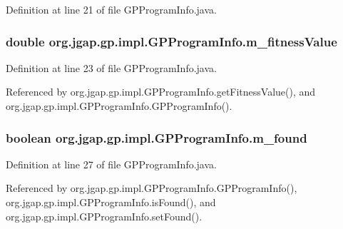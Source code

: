 Definition at line 21 of file G\-P\-Program\-Info.\-java.

\hypertarget{classorg_1_1jgap_1_1gp_1_1impl_1_1_g_p_program_info_aae643f2a3dc53c6264935548d4d93e41}{
\subsubsection[{m\-\_\-fitness\-Value}]{\setlength{\rightskip}{0pt plus 5cm}double org.\-jgap.\-gp.\-impl.\-G\-P\-Program\-Info.\-m\-\_\-fitness\-Value\hspace{0.3cm}{\ttfamily [private]}}}\label{classorg_1_1jgap_1_1gp_1_1impl_1_1_g_p_program_info_aae643f2a3dc53c6264935548d4d93e41}


Definition at line 23 of file G\-P\-Program\-Info.\-java.



Referenced by org.\-jgap.\-gp.\-impl.\-G\-P\-Program\-Info.\-get\-Fitness\-Value(), and org.\-jgap.\-gp.\-impl.\-G\-P\-Program\-Info.\-G\-P\-Program\-Info().

\hypertarget{classorg_1_1jgap_1_1gp_1_1impl_1_1_g_p_program_info_ae280cb35b66e8c6cbff5c7440a51afc5}{
\subsubsection[{m\-\_\-found}]{\setlength{\rightskip}{0pt plus 5cm}boolean org.\-jgap.\-gp.\-impl.\-G\-P\-Program\-Info.\-m\-\_\-found\hspace{0.3cm}{\ttfamily [private]}}}\label{classorg_1_1jgap_1_1gp_1_1impl_1_1_g_p_program_info_ae280cb35b66e8c6cbff5c7440a51afc5}


Definition at line 27 of file G\-P\-Program\-Info.\-java.



Referenced by org.\-jgap.\-gp.\-impl.\-G\-P\-Program\-Info.\-G\-P\-Program\-Info(), org.\-jgap.\-gp.\-impl.\-G\-P\-Program\-Info.\-is\-Found(), and org.\-jgap.\-gp.\-impl.\-G\-P\-Program\-Info.\-set\-Found().

